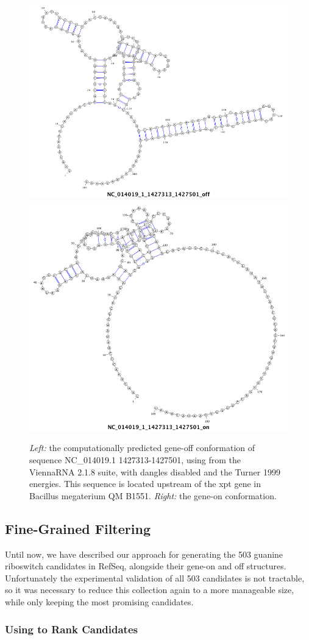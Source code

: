 \begin{figure}[!ht]
  \centering
    \includegraphics[width=.45\textwidth]{Figures/Ribofinder/NC_014019_1_1427313_1427501_off.png}
    \hfill
    \includegraphics[width=.45\textwidth]{Figures/Ribofinder/NC_014019_1_1427313_1427501_on.png}
    \caption{{\em Left:} the computationally predicted gene-off conformation of sequence NC\_014019.1 1427313-1427501, using  from the ViennaRNA 2.1.8 suite, with dangles disabled and the Turner 1999 energies. This sequence is located upstream of the xpt gene in Bacillus megaterium QM B1551. {\em Right:} the gene-on conformation.}
  \label{fig:example_ss}
\end{figure}

\subsection{Fine-Grained Filtering} \label{sub:fine}

Until now, we have described our approach for generating the 503 guanine riboswitch candidates in RefSeq, alongside their gene-on and off structures. Unfortunately the experimental validation of all 503 candidates is not tractable, so it was necessary to reduce this collection again to a more manageable size, while only keeping the most promising candidates.

\subsubsection{Using \foldalign to Rank Candidates} \label{ssub:foldalign}
